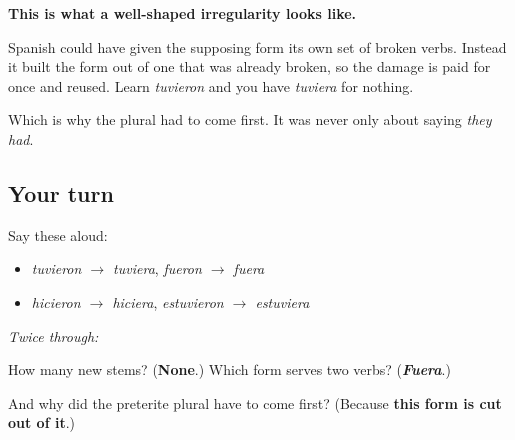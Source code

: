 \begin{culture}
\textbf{This is what a well-shaped irregularity looks like.}

Spanish could have given the supposing form its own set of broken verbs. Instead it built the form out of one that was already broken, so the damage is paid for once and reused. Learn \emph{tuvieron} and you have \emph{tuviera} for nothing.

Which is why the plural had to come first. It was never only about saying \emph{they had}.
\end{culture}

\subsection*{Your turn}
Say these aloud:

\begin{itemize}
\raggedright
  \item \emph{tuvieron $\to$ tuviera}, \emph{fueron $\to$ fuera}
  \item \emph{hicieron $\to$ hiciera}, \emph{estuvieron $\to$ estuviera}
\end{itemize}

\emph{Twice through:}

\begin{tcolorbox}[breakable,colback=teal!4,colframe=teal!35!black,title={Before you move on}]
How many new stems? (\textbf{None}.) Which form serves two verbs? (\emph{\textbf{Fuera}}.)

And why did the preterite plural have to come first? (Because \textbf{this form is cut out of it}.)
\end{tcolorbox}
